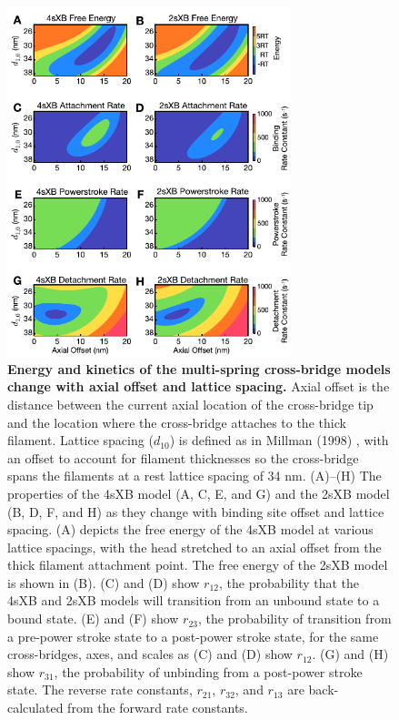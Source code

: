 \documentclass[10pt]{article}
\newcommand{\citep}[1]{\cite{#1}} %
\begin{document}
\begin{figure}[!ht]
    \begin{center}
    \includegraphics[width=3.25in]{../imgs/fig_kinetics_contours.pdf}
    \caption{ \textbf{Energy and kinetics of the multi-spring cross-bridge models change with axial offset and lattice spacing.} 
        Axial offset is the distance between the current axial location of the cross-bridge tip and the location where the cross-bridge attaches to the thick filament.  
        Lattice spacing ($d_{10}$) is defined as in Millman (1998) \protect\citep{Millman1998}, with an offset to account for filament thicknesses so the cross-bridge spans the filaments at a rest lattice spacing of 34 nm. 
        (A)--(H)  The properties of the 4sXB model (A, C, E, and G) and the 2sXB model (B, D, F, and H) as they change with binding site offset and lattice spacing.
        (A) depicts the free energy of the 4sXB model at various lattice spacings, with the head stretched to an axial offset from the thick filament attachment point.
        The free energy of the 2sXB model is shown in (B).  
        (C) and (D) show $r_{12}$, the probability that the 4sXB and 2sXB models will transition from an unbound state to a bound state. 
        (E) and (F) show $r_{23}$, the probability of transition from a pre-power stroke state to a post-power stroke state, for the same cross-bridges, axes, and scales as (C) and (D) show $r_{12}$.
        (G) and (H) show $r_{31}$, the probability of unbinding from a post-power stroke state. 
        The reverse rate constants, $r_{21}$, $r_{32}$, and $r_{13}$ are back-calculated from the forward rate constants.
        \label{fig_kinetics_contours}
        }
    \end{center}
\end{figure}
\end{document}
